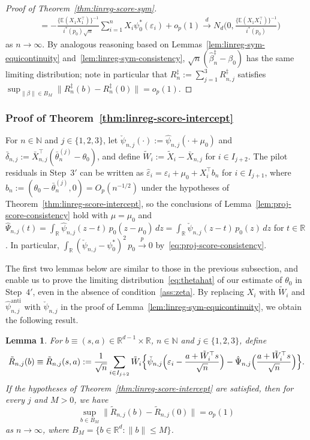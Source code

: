 \documentclass[a4paper]{article}
\newcommand{\N}{\mathbb{N}}
\newcommand{\R}{\mathbb{R}}
\newcommand{\E}{\mathbb{E}}
\newcommand{\norm}[1]{\|{#1}\|}
\newcommand{\cvp}{\overset{p}{\to}}
\newcommand{\cvd}{\overset{d}{\to}}
\newtheorem{lemma}[theorem]{Lemma}
\theoremstyle{definition}
\begin{document}
\begin{proof}[Proof of Theorem~\ref{thm:linreg-score-sym}]
\begin{align*}
&= -\frac{\{\E(X_1 X_1^\top)\}^{-1}}{i^*(p_0)\sqrt{n}}\sum_{i=1}^n X_i\psi_0^*(\varepsilon_i) + o_p(1) \cvd N_d\biggl(0, \frac{\{\E(X_1 X_1^\top)\}^{-1}}{i^*(p_0)}\biggr)
\end{align*}
as $n \to \infty$. By analogous reasoning based on Lemmas~\ref{lem:linreg-sym-equicontinuity} and~\ref{lem:linreg-sym-consistency}, $\sqrt{n}(\hat{\beta}_n^\ddagger - \beta_0)$ has the same limiting distribution; note in particular that $R_n^\ddagger := \sum_{j=1}^3 R_{n,j}^\ddagger$ satisfies $\sup_{\norm{\beta} \in B_M} \norm{R_n^\ddagger(b) - R_n^\ddagger(0)} = o_p(1)$.
\end{proof}

\subsubsection{Proof of Theorem~\ref{thm:linreg-score-intercept}}
\label{subsec:linreg-intercept-proofs}

For $n \in \N$ and $j \in \{1,2,3\}$, let $\check{\psi}_{n,j}(\cdot) := \hat{\psi}_{n,j}(\cdot + \mu_0)$ and $\bar{\delta}_{n,j} := \bar{X}_{n,j}^\top(\bar{\theta}_n^{(j)} - \theta_0)$, and define $\tilde{W}_i := \tilde{X}_i - \bar{X}_{n,j}$ for $i \in I_{j+2}$. The pilot residuals in Step~$3'$ can be written as $\hat{\varepsilon}_i = \varepsilon_i + \mu_0 + X_i^\top b_n$ for $i \in I_{j+1}$, where $b_n := (\theta_0 - \bar{\theta}_n^{(j)}, 0) = O_p(n^{-1/2})$ under the hypotheses of Theorem~\ref{thm:linreg-score-intercept}, so the conclusions of Lemma~\ref{lem:proj-score-consistency} hold with $\mu = \mu_0$ and $\hat{\Psi}_{n,j}(t) = \int_\R \hat{\psi}_{n,j}(z - t)\,p_0(z - \mu_0)\,dz = \int_\R \check{\psi}_{n,j}(z - t)\,p_0(z)\,dz$ for $t \in \R$. In particular, $\int_\R (\check{\psi}_{n,j} - \psi_0^*)^2\,p_0 \cvp 0$ by~\eqref{eq:proj-score-consistency}.

The first two lemmas below are similar to those in the previous subsection, and enable us to prove the limiting distribution~\eqref{eq:thetahat} of our estimate of $\theta_0$ in Step~$4'$, even in the absence of condition~\ref{ass:zeta}. By replacing $X_i$ with $\tilde{W}_i$ and $\hat{\psi}_{n,j}^{\mathrm{anti}}$ with $\check{\psi}_{n,j}$ in the proof of Lemma~\ref{lem:linreg-sym-equicontinuity}, we obtain the following result.

\begin{lemma}
\label{lem:linreg-intercept-equicontinuity}
For $b \equiv (s,a) \in \R^{d-1} \times \R$, $n \in \N$ and $j \in \{1,2,3\}$, define
\[
\tilde{R}_{n,j}(b) \equiv \tilde{R}_{n,j}(s,a) := \frac{1}{\sqrt{n}}\sum_{i \in I_{j+2}} \tilde{W}_i\Bigl\{\check{\psi}_{n,j}\Bigl(\varepsilon_i - \frac{a + \tilde{W}_i^\top s}{\sqrt{n}}\Bigr) - \hat{\Psi}_{n,j}\Bigl(\frac{a + \tilde{W}_i^\top s}{\sqrt{n}}\Bigr)\Bigr\}.
\] 
If the hypotheses of Theorem~\ref{thm:linreg-score-intercept} are satisfied, then for every $j$ and $M > 0$, we have
\[
\sup_{b \in B_M}\norm{\tilde{R}_{n,j}(b) - \tilde{R}_{n,j}(0)} = o_p(1)
\]
as $n \to \infty$, where $B_M = \{b \in \R^d : \norm{b} \leq M\}$.
\end{lemma}
\end{document}
